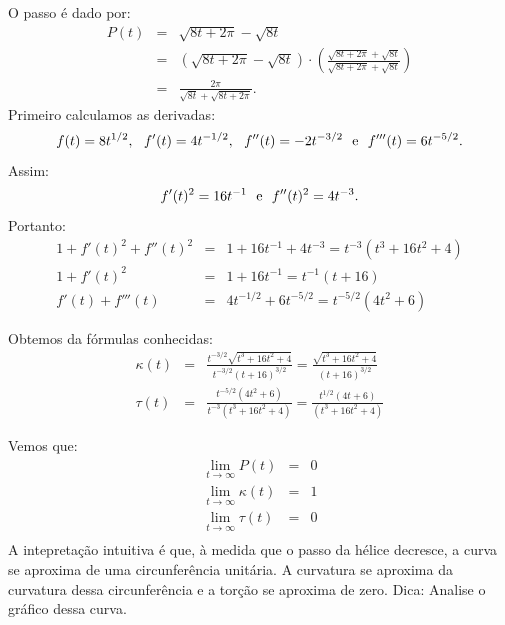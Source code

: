   \begin{resol}
    O passo é dado por:
    \begin{eqnarray*}
      P(t) &=& \sqrt{8t+2\pi}- \sqrt{8t}\\
      &=&\left(\sqrt{8t+2\pi}- \sqrt{8t}\right)\cdot\left(\frac{\sqrt{8t+2\pi}+\sqrt{8t}}{ \sqrt{8t+2\pi}+\sqrt{8t}}\right)\\
      &=&\frac{2\pi}{\sqrt{8t} + \sqrt{8t+2\pi}}.
    \end{eqnarray*}
  Primeiro calculamos as derivadas:
  $$f(t)=8t^{1/2}, ~~ f'(t)=4 t^{-1/2}, ~~ f''(t)=-2 t^{-3/2} ~ \hbox{ e } ~ f'''(t)=6 t^{-5/2}.$$
  Assim:
  $$f'(t)^2=16 t^{-1} ~ \hbox{ e } ~ f''(t)^2=4 t^{-3}.$$
  Portanto:
  \begin{eqnarray*}
   1+f'(t)^2+f''(t)^2 &=& 1 + 16t^{-1} + 4t^{-3} = t^{-3}\left(t^{3} + 16t^{2} + 4\right)\\
   1+f'(t)^2 &=&1+16t^{-1}=t^{-1}\left(t + 16\right)\\
   f'(t)+f'''(t) &=&4t^{-1/2}+6t^{-5/2}=t^{-5/2}\left(4t^2 + 6\right)
     \end{eqnarray*}

Obtemos da fórmulas conhecidas:
\begin{eqnarray*}
  \kappa(t) &=& \frac{t^{-3/2}\sqrt{t^{3} + 16t^{2} + 4}}{t^{-3/2}\left(t+16\right)^{3/2}}= \frac{\sqrt{t^{3} + 16t^{2} + 4}}{\left(t+16\right)^{3/2}}\\
\tau(t) &=& \frac{t^{-5/2}\left(4t^2 + 6\right)}{t^{-3}\left(t^{3} + 16t^{2} + 4\right)} =\frac{t^{1/2}\left(4t + 6\right)}{\left(t^{3} + 16t^{2} + 4\right)}
\end{eqnarray*}

Vemos que:
\begin{eqnarray*}
  \lim_{t\to \infty} P(t) &=& 0\\
  \lim_{t\to \infty} \kappa(t) &=& 1\\
  \lim_{t\to \infty} \tau(t) &=& 0\\
\end{eqnarray*}
A intepretação intuitiva é que, à medida que o passo da hélice decresce, a curva se aproxima de uma circunferência unitária.  A curvatura se aproxima da curvatura dessa circunferência e a torção se aproxima de zero. Dica: Analise o gráfico dessa curva.
  \end{resol}



